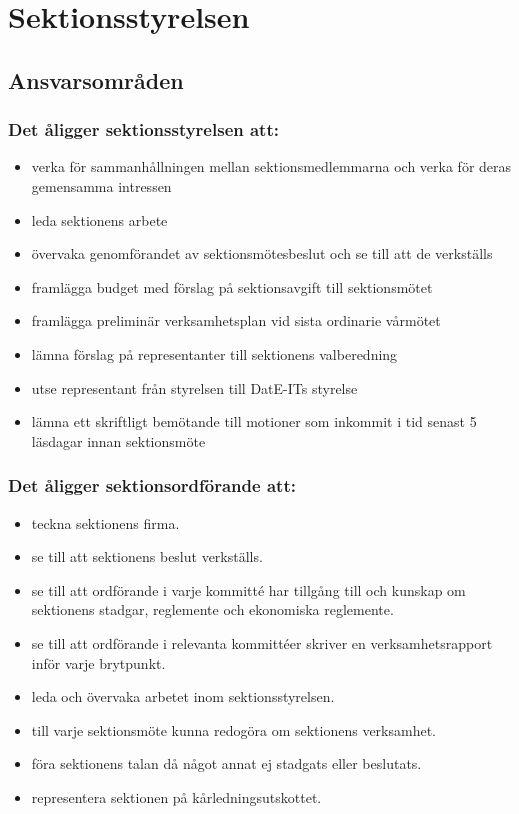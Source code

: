 \section{Sektionsstyrelsen}

\subsection{Ansvarsområden}

\subsubsection{Det åligger sektionsstyrelsen att:}

\begin{itemize}
  \item verka för sammanhållningen mellan sektionsmedlemmarna och verka för deras gemensamma intressen 
  \item leda sektionens arbete 
  \item övervaka genomförandet av sektionsmötesbeslut och se till att de verkställs 
  \item framlägga budget med förslag på sektionsavgift till sektionsmötet 
  \item framlägga preliminär verksamhetsplan vid sista ordinarie vårmötet 
  \item lämna förslag på representanter till sektionens valberedning 
  \item utse representant från styrelsen till DatE-ITs styrelse
  \item lämna ett skriftligt bemötande till motioner som inkommit i tid senast 5 läsdagar innan sektionsmöte
\end{itemize}

\subsubsection{Det åligger sektionsordförande att:} 

\begin{itemize}
  \item teckna sektionens firma.
  \item se till att sektionens beslut verkställs.
  \item se till att ordförande i varje kommitté har tillgång till och kunskap om sektionens stadgar, reglemente och ekonomiska reglemente.
  \item se till att ordförande i relevanta kommittéer skriver en verksamhetsrapport inför varje brytpunkt.
  \item leda och övervaka arbetet inom sektionsstyrelsen.
  \item till varje sektionsmöte kunna redogöra om sektionens verksamhet.
  \item föra sektionens talan då något annat ej stadgats eller beslutats. 
  \item representera sektionen på kårledningsutskottet.
\end{itemize}

